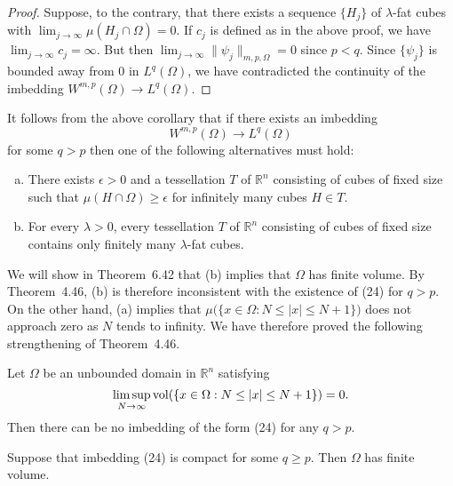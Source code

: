 \begin{proof}
  Suppose, to the contrary, that there exists a sequence $\{H_j\}$ of $\lambda$-fat
  cubes with $\lim_{j\to\infty} \mu(H_j\cap\Omega)=0$.
  If $c_j$ is defined as in the above proof, we have $\lim_{j\to\infty} c_j=\infty$.
  But then $\lim_{j\to\infty} \|\psi_j\|_{m,p,\Omega}=0$ since $p<q$.
  Since $\{\psi_j\}$ is bounded away from $0$ in $L^q(\Omega)$, we have contradicted
  the continuity of the imbedding $W^{m,p}(\Omega) \to L^q(\Omega)$.
\end{proof}


\begin{remark}
  It follows from the above corollary that if there exists an imbedding
  \begin{equation}\label{eq:6.24}
    W^{m,p}(\Omega) \to L^q(\Omega)
  \end{equation}
  for some $q>p$ then one of the following alternatives must hold:
  \begin{enumerate}[(a)]
    \item There exists $\epsilon>0$ and a tessellation $T$ of $\mathbb{R}^n$
      consisting of cubes of fixed size such that $\mu(H\cap\Omega)\geq\epsilon$
      for infinitely many cubes $H\in T$.
    \item For every $\lambda>0$, every tessellation $T$ of $\mathbb{R}^n$
      consisting of cubes of fixed size contains only finitely many $\lambda$-fat cubes.
  \end{enumerate}
  We will show in Theorem~6.42 that (b) implies that $\Omega$ has finite volume.
  By Theorem~4.46, (b) is therefore inconsistent with the existence of (24)
  for $q>p$. On the other hand, (a) implies that $\mu\bigl(\{x\in\Omega: N\leq |x|\leq N+1\}\bigr)$
  does not approach zero as $N$ tends to infinity. We have therefore proved the following
  strengthening of Theorem~4.46.
\end{remark}


\begin{theorem}
  Let $\Omega$ be an unbounded domain in $\mathbb{R}^n$ satisfying
  \[ \limsup_{N\to\infty} \operatorname{vol}(\{x\in\Omega: N\leq |x|\leq N+1\}) = 0. \]
  Then there can be no imbedding of the form (24) for any $q>p$.
\end{theorem}


\begin{theorem}
  Suppose that imbedding (24) is compact for some $q\geq p$.
  Then $\Omega$ has finite volume.
\end{theorem}

